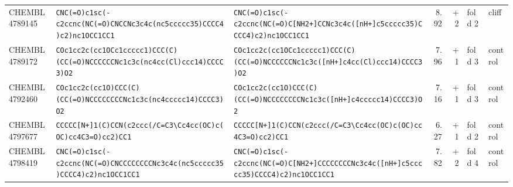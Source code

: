 \begin{longtable}{l p{4.4cm} p{4.4cm} r r l l}
CHEMBL4789145 & \texttt{CNC(\allowbreak{}=\allowbreak{}O)\allowbreak{}c1sc(\allowbreak{}-c2ccnc(\allowbreak{}NC(\allowbreak{}=\allowbreak{}O)\allowbreak{}CNCCNc3c4c(\allowbreak{}nc5ccccc35)\allowbreak{}CCCC4)\allowbreak{}c2)\allowbreak{}nc1OCC1CC1} & \texttt{CNC(\allowbreak{}=\allowbreak{}O)\allowbreak{}c1sc(\allowbreak{}-c2ccnc(\allowbreak{}NC(\allowbreak{}=\allowbreak{}O)\allowbreak{}C[NH2+]\allowbreak{}CCNc3c4c(\allowbreak{}[nH+]\allowbreak{}c5ccccc35)\allowbreak{}CCCC4)\allowbreak{}c2)\allowbreak{}nc1OCC1CC1} & 8.92 & +2 & fold 2 & cliff \\
CHEMBL4789172 & \texttt{COc1cc2c(\allowbreak{}cc1OCc1ccccc1)\allowbreak{}CCC(\allowbreak{}C)\allowbreak{}(\allowbreak{}CC(\allowbreak{}=\allowbreak{}O)\allowbreak{}NCCCCCCNc1c3c(\allowbreak{}nc4cc(\allowbreak{}Cl)\allowbreak{}ccc14)\allowbreak{}CCCC3)\allowbreak{}O2} & \texttt{COc1cc2c(\allowbreak{}cc1OCc1ccccc1)\allowbreak{}CCC(\allowbreak{}C)\allowbreak{}(\allowbreak{}CC(\allowbreak{}=\allowbreak{}O)\allowbreak{}NCCCCCCNc1c3c(\allowbreak{}[nH+]\allowbreak{}c4cc(\allowbreak{}Cl)\allowbreak{}ccc14)\allowbreak{}CCCC3)\allowbreak{}O2} & 7.96 & +1 & fold 3 & control \\
CHEMBL4792460 & \texttt{COc1cc2c(\allowbreak{}cc1O)\allowbreak{}CCC(\allowbreak{}C)\allowbreak{}(\allowbreak{}CC(\allowbreak{}=\allowbreak{}O)\allowbreak{}NCCCCCCCCNc1c3c(\allowbreak{}nc4ccccc14)\allowbreak{}CCCC3)\allowbreak{}O2} & \texttt{COc1cc2c(\allowbreak{}cc1O)\allowbreak{}CCC(\allowbreak{}C)\allowbreak{}(\allowbreak{}CC(\allowbreak{}=\allowbreak{}O)\allowbreak{}NCCCCCCCCNc1c3c(\allowbreak{}[nH+]\allowbreak{}c4ccccc14)\allowbreak{}CCCC3)\allowbreak{}O2} & 7.16 & +1 & fold 3 & control \\
CHEMBL4797677 & \texttt{CCCCC[N+]\allowbreak{}1(\allowbreak{}C)\allowbreak{}CCN(\allowbreak{}c2ccc(\allowbreak{}/\allowbreak{}C=\allowbreak{}C3\textbackslash{}Cc4cc(\allowbreak{}OC)\allowbreak{}c(\allowbreak{}OC)\allowbreak{}cc4C3=\allowbreak{}O)\allowbreak{}cc2)\allowbreak{}CC1} & \texttt{CCCCC[N+]\allowbreak{}1(\allowbreak{}C)\allowbreak{}CCN(\allowbreak{}c2ccc(\allowbreak{}/\allowbreak{}C=\allowbreak{}C3\textbackslash{}Cc4cc(\allowbreak{}OC)\allowbreak{}c(\allowbreak{}OC)\allowbreak{}cc4C3=\allowbreak{}O)\allowbreak{}cc2)\allowbreak{}CC1} & 6.27 & +1 & fold 2 & control \\
CHEMBL4798419 & \texttt{CNC(\allowbreak{}=\allowbreak{}O)\allowbreak{}c1sc(\allowbreak{}-c2ccnc(\allowbreak{}NC(\allowbreak{}=\allowbreak{}O)\allowbreak{}CNCCCCCCCCNc3c4c(\allowbreak{}nc5ccccc35)\allowbreak{}CCCC4)\allowbreak{}c2)\allowbreak{}nc1OCC1CC1} & \texttt{CNC(\allowbreak{}=\allowbreak{}O)\allowbreak{}c1sc(\allowbreak{}-c2ccnc(\allowbreak{}NC(\allowbreak{}=\allowbreak{}O)\allowbreak{}C[NH2+]\allowbreak{}CCCCCCCCNc3c4c(\allowbreak{}[nH+]\allowbreak{}c5ccccc35)\allowbreak{}CCCC4)\allowbreak{}c2)\allowbreak{}nc1OCC1CC1} & 7.82 & +2 & fold 4 & control \\

\end{longtable}
